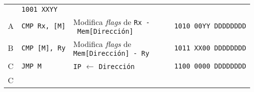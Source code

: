 \documentclass[12pt,twoside]{templates/unerthesis}
\begin{document}
\begin{longtable}[]{@{}llll@{}}
\begin{minipage}[t]{0.27\columnwidth}
\end{minipage} & \begin{minipage}[t]{0.27\columnwidth}\raggedright
\texttt{1001\ XXYY}\strut
\end{minipage}\tabularnewline
\begin{minipage}[t]{0.09\columnwidth}\raggedright
A\strut
\end{minipage} & \begin{minipage}[t]{0.27\columnwidth}\raggedright
\texttt{CMP\ Rx,\ {[}M{]}}\strut
\end{minipage} & \begin{minipage}[t]{0.27\columnwidth}\raggedright
Modifica \emph{flags} de \texttt{Rx\ -\ Mem{[}Dirección{]}}\strut
\end{minipage} & \begin{minipage}[t]{0.27\columnwidth}\raggedright
\texttt{1010\ 00YY\ DDDDDDDD}\strut
\end{minipage}\tabularnewline
\begin{minipage}[t]{0.09\columnwidth}\raggedright
B\strut
\end{minipage} & \begin{minipage}[t]{0.27\columnwidth}\raggedright
\texttt{CMP\ {[}M{]},\ Ry}\strut
\end{minipage} & \begin{minipage}[t]{0.27\columnwidth}\raggedright
Modifica \emph{flags} de \texttt{Mem{[}Dirección{]}\ -\ Ry}\strut
\end{minipage} & \begin{minipage}[t]{0.27\columnwidth}\raggedright
\texttt{1011\ XX00\ DDDDDDDD}\strut
\end{minipage}\tabularnewline
\begin{minipage}[t]{0.09\columnwidth}\raggedright
C\strut
\end{minipage} & \begin{minipage}[t]{0.27\columnwidth}\raggedright
\texttt{JMP\ M}\strut
\end{minipage} & \begin{minipage}[t]{0.27\columnwidth}\raggedright
\texttt{IP} \(\leftarrow\) \texttt{Dirección}\strut
\end{minipage} & \begin{minipage}[t]{0.27\columnwidth}\raggedright
\texttt{1100\ 0000\ DDDDDDDD}\strut
\end{minipage}\tabularnewline
\begin{minipage}[t]{0.09\columnwidth}\raggedright
C\strut
\end{minipage} & \begin{minipage}[t]{0.27\columnwidth}\raggedright

\end{minipage}
\end{longtable}
\end{document}
